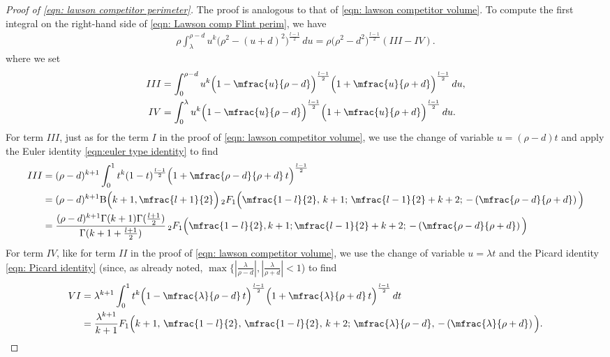 \documentclass[10pt,reqno]{amsart}
\numberwithin{equation}{section}
\theoremstyle{definition}
\begin{document}
{{\begin{proof}[Proof of \eqref{eqn: lawson competitor perimeter}] The proof is analogous to that of \eqref{eqn: lawson competitor volume}.
To compute the first integral on the right-hand side of \eqref{eqn: Lawson comp Flint perim}, we have 
\begin{equation}
\begin{split} 
\rho  \int_{\lambda}^{\rho-d} u^k \big(\rho^2 -(u+d)^2\big)^{\frac{l-1}{2}} \,du  = \rho \big(\rho^2 - d^2\big)^{\frac{l-1}{2}}(III - IV).   
\end{split}
\end{equation}
where we set 
\begin{align*}
    III  &= \int_0^{\rho - d} u^k \Big(1-\mfrac{u}{\rho-d} \Big)^{\frac{l-1}{2}} \Big(1+ \mfrac{u}{\rho+d} \Big)^{\frac{l-1}{2}}\,du,\\
    IV & = \int_0^{\lambda} u^k \Big(1-\mfrac{u}{\rho-d} \Big)^{\frac{l-1}{2}} \Big(1+ \mfrac{u}{\rho+d} \Big)^{\frac{l-1}{2}}\,du.
\end{align*}
For term $III$, just as for the term $I$ in the proof of \eqref{eqn: lawson competitor volume}, we use the change of variable $u = (\rho -d) t$ and  apply the Euler identity \eqref{eqn:euler type identity} to find 
\begin{align*}
    III& = (\rho-d)^{k+1} \int_0^1 t^k (1-t)^{\frac{l-1}{2}} \Big( 1 + \mfrac{\rho-d}{\rho+d}\, t \Big)^{\frac{l-1}{2}} \\
    & = (\rho-d)^{k+1} \mathrm{B}\Big( k+1 , \mfrac{l+1}{2}\Big) \, {}_2F_1\Big( \mfrac{1-l}{2},\, k+1; \,\mfrac{l-1}{2} + k+2;\, -\left( \mfrac{\rho -d}{\rho+ d}\right) \Big)\\
    & = \frac{(\rho-d)^{k+1} \Gamma(k+1)\Gamma(\frac{l+1}{2})}{\Gamma(k+1+ \frac{l+1}{2})} \, {}_2F_1\Big( \mfrac{1-l}{2} , k+1; \mfrac{l-1}{2} + k+2;\, -\left( \mfrac{\rho -d}{\rho+ d}\right) \Big)
\end{align*}
For term $IV$, like for term $II$ in the proof of \eqref{eqn: lawson competitor volume}, we use the change of variable $u =\lambda t$ and the Picard identity \eqref{eqn: Picard identity} (since, as already noted, $\max\{ |\frac{\lambda}{\rho-d}|, |\frac{\lambda}{\rho+d}|<1$) to find
\begin{align*}
    VI & = \lambda^{k+1} \int_0^1 t^k \Big(1 - \mfrac{\lambda}{\rho-d}\, t \Big)^{\frac{l-1}{2}} \Big(1 + \mfrac{\lambda}{\rho+d} \, t\Big)^{\frac{l-1}{2}} \,dt \\ 
    & = \frac{\lambda^{k+1}}{k+1} F_1\Big(k+1, \, \mfrac{1-l}{2}, \, \mfrac{1-l}{2}, \, k+2 ; \,\mfrac{\lambda}{\rho- d}, \, -\left( \mfrac{\lambda}{\rho+ d}\right) \Big).

\end{align*}
\end{proof}}}
\end{document}
